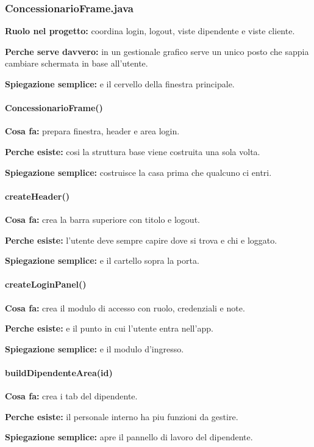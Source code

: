 \documentclass[12pt,a4paper]{article}
\begin{document}
\subsubsection*{ConcessionarioFrame.java}
\textbf{Ruolo nel progetto:} coordina login, logout, viste dipendente e viste cliente.

\textbf{Perche serve davvero:} in un gestionale grafico serve un unico posto che sappia cambiare schermata in base all'utente.

\textbf{Spiegazione semplice:} e il cervello della finestra principale.

\paragraph{ConcessionarioFrame()}
\textbf{Cosa fa:} prepara finestra, header e area login.

\textbf{Perche esiste:} cosi la struttura base viene costruita una sola volta.

\textbf{Spiegazione semplice:} costruisce la casa prima che qualcuno ci entri.

\paragraph{createHeader()}
\textbf{Cosa fa:} crea la barra superiore con titolo e logout.

\textbf{Perche esiste:} l'utente deve sempre capire dove si trova e chi e loggato.

\textbf{Spiegazione semplice:} e il cartello sopra la porta.

\paragraph{createLoginPanel()}
\textbf{Cosa fa:} crea il modulo di accesso con ruolo, credenziali e note.

\textbf{Perche esiste:} e il punto in cui l'utente entra nell'app.

\textbf{Spiegazione semplice:} e il modulo d'ingresso.

\paragraph{buildDipendenteArea(id)}
\textbf{Cosa fa:} crea i tab del dipendente.

\textbf{Perche esiste:} il personale interno ha piu funzioni da gestire.

\textbf{Spiegazione semplice:} apre il pannello di lavoro del dipendente.
\end{document}
